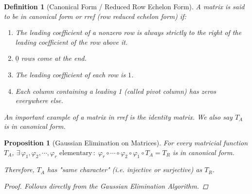 \documentclass[12pt]{article}
\newcommand{\Exist}[1]{\exists\,{#1}\,:\;}
\newcommand{\tuple}[1]{\underline{#1}}
\newtheorem{definition}{Definition}[subsection]
\newtheorem{proposition}{Proposition}[subsection]
\begin{document}
\begin{definition}[Canonical Form / Reduced Row Echelon Form]
  A matrix is said to be in canonical form or rref (row reduced echelon form) if:
  \begin{enumerate}
    \item The leading coefficient of a nonzero row is always strictly to the right of the leading coefficient of the row above it.
    \item $\tuple{0}$ rows come at the end.
    \item The leading coefficient of each row is $1$.
    \item Each column containing a leading 1 (called pivot column) has zeros everywhere else.
  \end{enumerate}
  An important example of a matrix in rref is the identity matrix. We also say $T_A$ is in canonical form.
\end{definition}

\begin{proposition}[Gaussian Elimination on Matrices]
  For every matricial function $T_A$, $\Exist{\varphi_1,\varphi_2,\cdots,\varphi_r\text{ elementary}} \varphi_r\circ \cdots\circ \varphi_2\circ \varphi_1\circ T_A=T_R$ is in canonical form.

  Therefore, $T_A$ has "same character" (i.e. injective or surjective) as $T_R$.

  \begin{proof}
    Follows directly from the Gaussian Elimination Algorithm.
  \end{proof}
\end{proposition}
\end{document}
